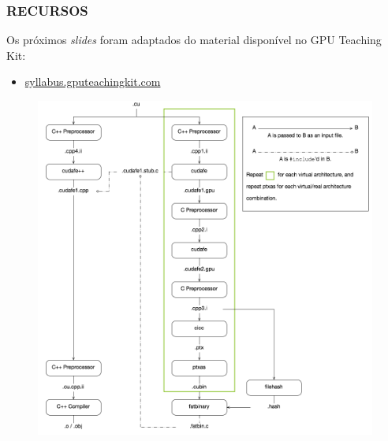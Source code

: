 \documentclass[10pt, compress]{beamer}
\begin{document}
\begin{frame}
    \frametitle{RECURSOS}
    Os próximos \emph{slides} foram adaptados do
    material disponível no \alert{GPU Teaching Kit}:
    \begin{itemize}
        \item \url{syllabus.gputeachingkit.com}
    \end{itemize}
\end{frame}

\begin{frame}
    \begin{figure}[H]
        \centering
        \includegraphics[width=.8\textwidth]{cuda-compilation}
    \end{figure}
\end{frame}


\maketitle
\end{document}
